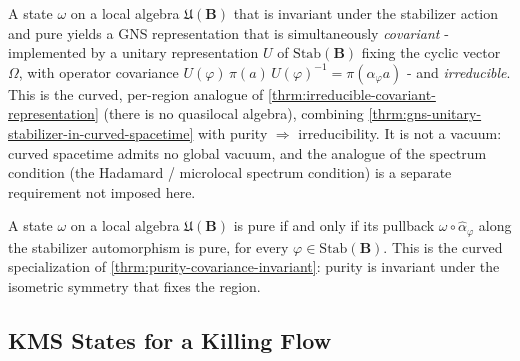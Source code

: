 \begin{theorem}
    \label{thrm:irreducible-covariant-representation-in-curved-spacetime}
    \leanok
    A state $\omega$ on a local algebra $\mathfrak{U}(\mathbf{B})$ that is invariant under the stabilizer action and pure yields a GNS representation that is simultaneously \emph{covariant} - implemented by a unitary representation $U$ of $\mathrm{Stab}(\mathbf{B})$ fixing the cyclic vector $\Omega$, with operator covariance $U(\varphi)\,\pi(a)\,U(\varphi)^{-1} = \pi(\hat\alpha_\varphi a)$ - and \emph{irreducible}. This is the curved, per-region analogue of \ref{thrm:irreducible-covariant-representation} (there is no quasilocal algebra), combining \ref{thrm:gns-unitary-stabilizer-in-curved-spacetime} with purity $\Rightarrow$ irreducibility. It is not a vacuum: curved spacetime admits no global vacuum, and the analogue of the spectrum condition (the Hadamard / microlocal spectrum condition) is a separate requirement not imposed here.
\end{theorem}

\begin{theorem}
    \label{thrm:purity-covariance-invariant-in-curved-spacetime}
    \leanok
    A state $\omega$ on a local algebra $\mathfrak{U}(\mathbf{B})$ is pure if and only if its pullback $\omega \circ \hat\alpha_\varphi$ along the stabilizer automorphism is pure, for every $\varphi \in \mathrm{Stab}(\mathbf{B})$. This is the curved specialization of \ref{thrm:purity-covariance-invariant}: purity is invariant under the isometric symmetry that fixes the region.
\end{theorem}

\subsection{KMS States for a Killing Flow}

